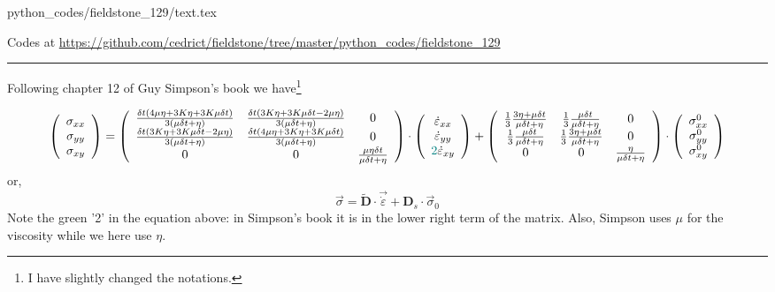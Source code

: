 \begin{flushright} {\tiny {\color{gray} python\_codes/fieldstone\_129/text.tex}} \end{flushright}



\begin{center}
Codes at \url{https://github.com/cedrict/fieldstone/tree/master/python_codes/fieldstone_129}
\end{center}

\par\noindent\rule{\textwidth}{0.4pt}


Following chapter 12 of Guy Simpson's book \cite{simp17} 
we have\footnote{I have slightly changed the notations.}

\[
\left(
\begin{array}{c}
\sigma_{xx}\\ 
\sigma_{yy}\\ 
\sigma_{xy} 
\end{array}
\right)
=
\left(
\begin{array}{ccc}
\frac{\delta t(4\mu \eta + 3K \eta+ 3K \mu\delta t)}{3(\mu \delta t + \eta)} &
\frac{\delta t(3K \eta+ 3K \mu\delta t - 2\mu \eta)}{3(\mu \delta t + \eta)} &
0 \\
\frac{\delta t(3K \eta+ 3K \mu\delta t  - 2\mu \eta)}{3(\mu \delta t + \eta)}&
\frac{\delta t(4\mu \eta + 3K \eta+ 3K \mu\delta t)}{3(\mu \delta t + \eta)} &
0  \\
0 & 0 & \frac{\mu \eta \delta t }{\mu \delta t + \eta}  \\
\end{array}
\right)
\cdot
\left(
\begin{array}{c}
\dot\varepsilon_{xx}\\ 
\dot\varepsilon_{yy}\\ 
{\color{teal}2}\dot\varepsilon_{xy} 
\end{array}
\right) 
+
\left(
\begin{array}{cccccc}
\frac13\frac{3\eta + \mu \delta t}{\mu\delta t+\eta} & 
\frac13\frac{\mu \delta t}{\mu\delta t+\eta} & 
0\\
\frac13\frac{\mu \delta t}{\mu\delta t+\eta} & 
\frac13\frac{3\eta + \mu \delta t}{\mu\delta t+\eta} & 
0\\
0 & 0 & \frac{ \eta}{\mu\delta t + \eta}  
\end{array}
\right)
\cdot
\left(
\begin{array}{c}
\sigma_{xx}^0\\ 
\sigma_{yy}^0\\ 
\sigma_{xy}^0 
\end{array}
\right) 
\]
or, 
\[
\vec{\sigma} = \tilde{\bm D}\cdot \vec{\dot{\varepsilon}} +
{\bm D}_s \cdot \vec{\sigma}_0 
\]
Note the green '2' in the equation above: in Simpson's book it is in the
lower right term of the matrix. Also, Simpson uses $\mu$ for the viscosity
while we here use $\eta$. 

